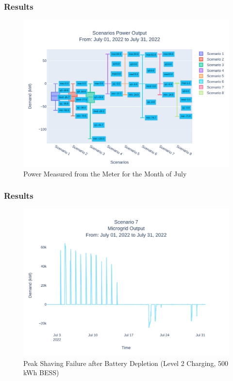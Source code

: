 \documentclass[aspectratio=169, 8 pt]{beamer}
\begin{document}
		\begin{frame}
			\frametitle{Results}
			\begin{figure}
				\centering
				\includegraphics[width=0.7\linewidth]{Fig/Option_3/4_Scn_Output_Run_3_Jul_01_2022_to_Jul_31_2022}
				\caption{\footnotesize  Power Measured from the Meter for the Month of July}
				\label{fig:4scnoutputrun2jul012022tojul312022}
			\end{figure}
		\end{frame}
		
		\begin{frame}
			\frametitle{Results}
			\begin{figure}
				\centering
				\includegraphics[width=0.7\linewidth]{Fig/Option_3/4_Scenario_7_Run_3_Mg_Output_Jul_01_2022_to_Jul_31_2022.pdf}
				\caption{\footnotesize Peak Shaving Failure after Battery Depletion (Level 2 Charging, 500 kWh BESS)}
				\label{fig:scenario3peakshaving}
			\end{figure}
		\end{frame}
		
\end{document}
